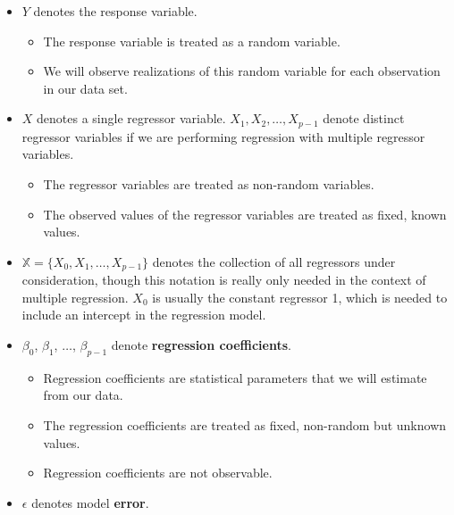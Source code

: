 \documentclass[
]{book}
\providecommand{\tightlist}{%
  \setlength{\itemsep}{0pt}\setlength{\parskip}{0pt}}
\theoremstyle{definition}
\theoremstyle{definition}
\theoremstyle{definition}
\theoremstyle{definition}
\theoremstyle{remark}
\begin{document}
\begin{itemize}
\tightlist
\item
  \(Y\) denotes the response variable.

  \begin{itemize}
  \tightlist
  \item
    The response variable is treated as a random variable.
  \item
    We will observe realizations of this random variable for each observation in our data set.
  \end{itemize}
\item
  \(X\) denotes a single regressor variable. \(X_1, X_2, \ldots, X_{p-1}\) denote distinct regressor variables if we are performing regression with multiple regressor variables.

  \begin{itemize}
  \tightlist
  \item
    The regressor variables are treated as non-random variables.
  \item
    The observed values of the regressor variables are treated as fixed, known values.
  \end{itemize}
\item
  \(\mathbb{X}=\{X_0, X_1,\ldots,X_{p-1}\}\) denotes the collection of all regressors under consideration, though this notation is really only needed in the context of multiple regression. \(X_0\) is usually the constant regressor 1, which is needed to include an intercept in the regression model.
\item
  \(\beta_0\), \(\beta_1\), \(\ldots\), \(\beta_{p-1}\) denote \textbf{regression coefficients}.

  \begin{itemize}
  \tightlist
  \item
    Regression coefficients are statistical parameters that we will estimate from our data.
  \item
    The regression coefficients are treated as fixed, non-random but unknown values.
  \item
    Regression coefficients are not observable.
  \end{itemize}
\item
  \(\epsilon\) denotes model \textbf{error}.


\end{itemize}
\end{document}
